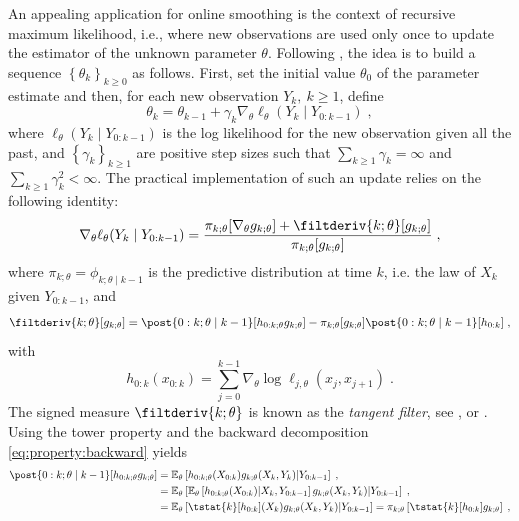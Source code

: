 \documentclass[12pt]{article}
\newcommand{\md}[1]{g_{#1}}
\newcommand{\logllh}[1]{\ell_{#1}}
\newcommand{\pred}[1]{\pi_{#1}}
\newcommand{\parvec}{\theta}
\newcommand{\af}[1]{h_{#1}}
\newcommand{\deriv}{\nabla_{\parvec}}
\newcommand{\eqsp}{\;}
\newcommand{\qg}[1]{\ell_{#1}}
\begin{document}
An appealing application for online smoothing is the context of recursive maximum likelihood, i.e., where new observations are used only once to update the estimator of the unknown parameter $\parvec$.
Following \cite{legland1997recursive}, the idea is to build a sequence $\left\lbrace\parvec_k\right\rbrace_{k\geqslant 0}$ as follows. First, set the initial value $\parvec_0$ of the parameter estimate and then, for each new observation $Y_{k},~k\geqslant 1$, define
$$
\theta_{k} = \theta_{k-1} + \gamma_k \deriv \logllh{\parvec}(Y_k \mid Y_{0:k - 1}) \eqsp,
$$
where $\logllh{\parvec}(Y_k \mid Y_{0:k - 1})$ is the log likelihood for the new observation given all the past, and $\left\lbrace\gamma_k\right\rbrace_{k\geqslant 1}$ are positive step sizes such that $\sum_{k \geqslant 1}\gamma_k = \infty$ and $\sum_{k \geqslant 1}\gamma_k^2 < \infty$. The practical implementation of such an update relies on the following identity:
\begin{equation}
\deriv \logllh{\parvec}(Y_k \mid Y_{0:k - 1})  
=  \frac{\pred{k;\parvec}[\deriv \md{k;\parvec}] + \filtderiv{k;\parvec}[\md{k;\parvec}]}{\pred{k;\parvec}[\md{k;\parvec}]}\eqsp,
\label{eq:online:gradient}
\end{equation}
where $\pred{k;\parvec} = \phi_{k;\parvec \mid k - 1}$ is the predictive distribution at time $k$, i.e. the law of $X_k$ given $Y_{0:k-1}$,   and 
$$\filtderiv{k;\parvec}[\md{k;\parvec}] = \post{0:k;\parvec \mid k - 1} [\af{0:k;\parvec} \md{k;\parvec}] - \pred{k;\parvec}[\md{k;\parvec}]  \post{0:k;\parvec \mid k - 1 }[\af{0:k}]\eqsp,$$
with
\begin{equation}
\label{eq:complete:gradient:log}
\af{0:k}(x_{0:k}) =  \sum_{j = 0}^{k - 1} \deriv\log \qg{j, \parvec}(x_j,x_{j+1})\eqsp.
\end{equation}
The signed measure $\filtderiv{k;\parvec}$ is known as the \textit{tangent filter}, see \cite[Chapter~10]{cappe2005inference}, \cite{delmoral2015uniform} or \cite{olsson2020particle}. 
Using the tower property  and the backward decomposition \eqref{eq:property:backward} yields
\begin{align*}
\post{0:k;\parvec \mid k - 1} [\af{0:k;\parvec} \md{k;\parvec}]  &= \mathbb{E}_\parvec\left[\af{0:k;\parvec}(X_{0:k}) \md{k;\parvec}(X_k,Y_k)\middle|Y_{0:k-1}\right]\eqsp,\\
&= \mathbb{E}_\parvec\left[\mathbb{E}_\parvec\left[\af{0:k;\parvec}(X_{0:k}) \middle|X_k,Y_{0:k-1}\right]\md{k;\parvec}(X_k,Y_k)\middle|Y_{0:k-1}\right]\eqsp,\\
&= \mathbb{E}_\parvec\left[\tstat{k} [\af{0:k}](X_k) \md{k;\parvec}(X_k,Y_k)\middle|Y_{0:k-1}\right] =  \pred{k;\parvec}\left[\tstat{k} [\af{0:k}]\md{k;\parvec}\right]\eqsp,
\end{align*}
\end{document}
